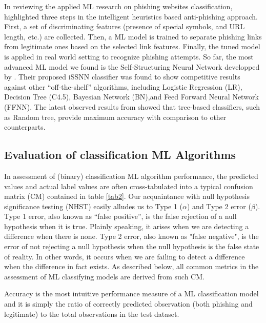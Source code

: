 \documentclass[deca,nonblindrev]{informs3} %
\begin{document}
In reviewing the applied ML research on phishing websites classification,   \cite{Mohammad2015a} highlighted three steps in the intelligent  heuristics  based  anti-phishing approach.  First, a set of discriminating features (presence of special symbols, and URL length, etc.) are collected. Then,  a ML model is trained to separate phishing links from legitimate ones based on the selected link features. Finally, the tuned model is applied in real world setting to recognize phishing attempts.  So far, the most advanced ML model we found is the Self-Structuring Neural Network developped by \cite{7727750}. Their proposed iSSNN classifier was found to show competitive results against other ``off-the-shelf'' algorithms, including Logistic Regression (LR), Decision Tree (C4.5), Bayesian Network (BN),and  Feed Forward Neural Network (FFNN).
The latest observed results from \cite{10.1007/978-981-10-5699-4_50}  showed that tree-based classifiers, such as Random tree,  provide maximum accuracy with comparison to other counterparts.

 



\subsection{Evaluation of classification  ML Algorithms}

In assessment of (binary) classification  ML algorithm performance, the predicted  values and actual label values  are often cross-tabulated into  a typical confusion matrix (CM) contained in  table \ref{tab2}. Our acquaintance with null hypothesis  significance  testing (NHST) easily alludes us to Type 1 ($\alpha$) and  Type 2 error ($\beta$). Type 1 error,  also known as “false positive”, is the false rejection of a null hypothesis when it is true. Plainly speaking, it arises when we are detecting a difference when there is none. Type 2  error, also known as "false negative", is the error of not rejecting a null hypothesis when the null hypothesis is the false state of reality. In other words, it occurs when we are failing to detect a difference when the difference in fact exists. As described below, all common metrics in the assessment of ML classifying models are derived from such CM.

Accuracy is the most intuitive performance measure of a ML classification model  and it is simply the ratio of correctly predicted observation (both phishing and legitimate) to the total observations in the test dataset.
\end{document}
